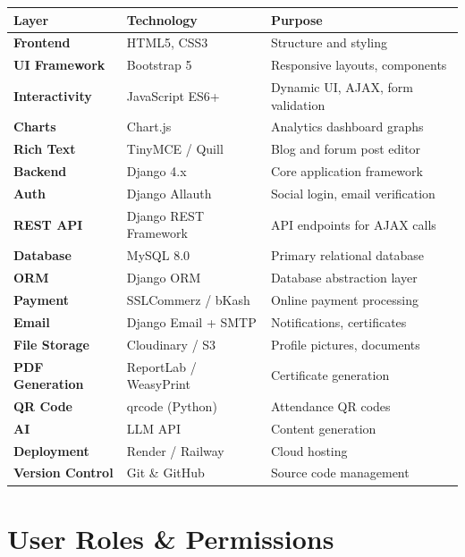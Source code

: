 \documentclass[12pt,a4paper]{article}
\begin{document}
\renewcommand{\arraystretch}{1.5}
\begin{tabularx}{\textwidth}{>{\bfseries\color{primary}}l >{\ttfamily\small}l X}
\toprule
\textbf{Layer} & \textbf{Technology} & \textbf{Purpose} \\
\midrule
Frontend       & HTML5, CSS3         & Structure and styling \\
\rowcolor{rowgray}
UI Framework   & Bootstrap 5         & Responsive layouts, components \\
Interactivity  & JavaScript ES6+     & Dynamic UI, AJAX, form validation \\
\rowcolor{rowgray}
Charts         & Chart.js            & Analytics dashboard graphs \\
Rich Text      & TinyMCE / Quill     & Blog and forum post editor \\
\rowcolor{rowgray}
Backend        & Django 4.x          & Core application framework \\
Auth           & Django Allauth      & Social login, email verification \\
\rowcolor{rowgray}
REST API       & Django REST Framework& API endpoints for AJAX calls \\
Database       & MySQL 8.0           & Primary relational database \\
\rowcolor{rowgray}
ORM            & Django ORM          & Database abstraction layer \\
Payment        & SSLCommerz / bKash  & Online payment processing \\
\rowcolor{rowgray}
Email          & Django Email + SMTP & Notifications, certificates \\
File Storage   & Cloudinary / S3     & Profile pictures, documents \\
\rowcolor{rowgray}
PDF Generation & ReportLab / WeasyPrint & Certificate generation \\
QR Code        & qrcode (Python)     & Attendance QR codes \\
\rowcolor{rowgray}
AI             & LLM API             & Content generation \\
Deployment     & Render / Railway    & Cloud hosting \\
\rowcolor{rowgray}
Version Control& Git \& GitHub       & Source code management \\
\bottomrule
\end{tabularx}

\section{User Roles \& Permissions}
\end{document}
